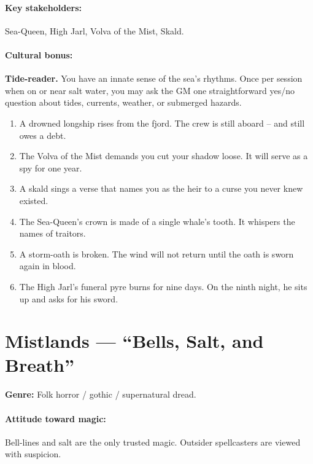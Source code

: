 \paragraph{Key stakeholders:} Sea-Queen, High Jarl, Volva of the Mist, Skald.

\paragraph{Cultural bonus:} \textbf{Tide-reader.} You have an innate sense of the sea's rhythms. Once per session when on or near salt water, you may ask the GM one straightforward yes/no question about tides, currents, weather, or submerged hazards.

\begin{tcolorbox}[colback=gray!5!white, colframe=gray!70!black, title=Linn Mini-Generator (d6),breakable]
\begin{enumerate}
\item A drowned longship rises from the fjord. The crew is still aboard -- and still owes a debt.
\item The Volva of the Mist demands you cut your shadow loose. It will serve as a spy for one year.
\item A skald sings a verse that names you as the heir to a curse you never knew existed.
\item The Sea-Queen's crown is made of a single whale's tooth. It whispers the names of traitors.
\item A storm-oath is broken. The wind will not return until the oath is sworn again in blood.
\item The High Jarl's funeral pyre burns for nine days. On the ninth night, he sits up and asks for his sword.
\end{enumerate}
\end{tcolorbox}

\section{Mistlands --- ``Bells, Salt, and Breath''}
\textbf{Genre:} Folk horror / gothic / supernatural dread.

\paragraph{Attitude toward magic:} Bell-lines and salt are the only trusted magic. Outsider spellcasters are viewed with suspicion.

